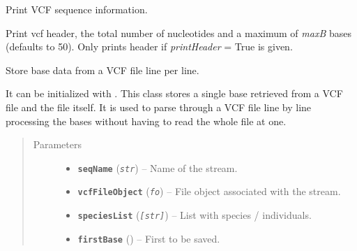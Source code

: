 \documentclass[letterpaper,10pt,english]{sphinxmanual}
\begin{document}
\begin{fulllineitems}

\begin{fulllineitems}
\label{vcf:libPoMo.vcf.VCFSeq.print_info}
Print VCF sequence information.

Print vcf header, the total number of nucleotides and a
maximum of \emph{maxB} bases (defaults to 50). Only prints header
if \emph{printHeader} = True is given.

\end{fulllineitems}


\end{fulllineitems}


\begin{fulllineitems}
\label{vcf:libPoMo.vcf.VCFStream}
Store base data from a VCF file line per line.

It can be initialized with {\hyperref[vcf:libPoMo.vcf.init_seq]{}}.  This class stores a
single base retrieved from a VCF file and the file itself.  It is
used to parse through a VCF file line by line processing the bases
without having to read the whole file at one.
\begin{quote}\begin{description}
\item[{Parameters}] \leavevmode\begin{itemize}
\item {} 
\textbf{\texttt{seqName}} (\emph{\texttt{str}}) -- Name of the stream.

\item {} 
\textbf{\texttt{vcfFileObject}} (\emph{\texttt{fo}}) -- File object associated with the stream.

\item {} 
\textbf{\texttt{speciesList}} (\emph{\texttt{{[}str{]}}}) -- List with species / individuals.

\item {} 
\textbf{\texttt{firstBase}} ({\hyperref[vcf:libPoMo.vcf.NucBase]{}}) -- First {\hyperref[vcf:libPoMo.vcf.NucBase]{}} to be saved.


\end{itemize}
\end{description}
\end{quote}
\end{fulllineitems}
\end{document}
